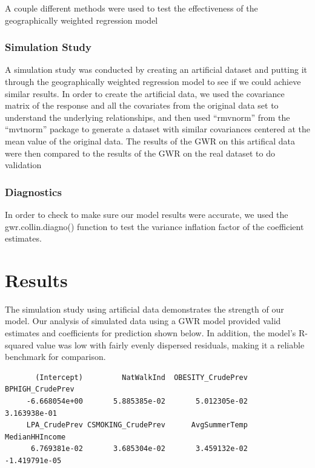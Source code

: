 \documentclass[
]{article}
\begin{document}
A couple different methods were used to test the effectiveness of the
geographically weighted regression model

\subsubsection{Simulation Study}\label{simulation-study}

A simulation study was conducted by creating an artificial dataset and
putting it through the geographically weighted regression model to see
if we could achieve similar results. In order to create the artificial
data, we used the covariance matrix of the response and all the
covariates from the original data set to understand the underlying
relationships, and then used ``rmvnorm'' from the ``mvtnorm'' package to
generate a dataset with similar covariances centered at the mean value
of the original data. The results of the GWR on this artifical data were
then compared to the results of the GWR on the real dataset to do
validation

\subsubsection{Diagnostics}\label{diagnostics}

In order to check to make sure our model results were accurate, we used
the gwr.collin.diagno() function to test the variance inflation factor
of the coefficient estimates.

\section{Results}\label{results}

The simulation study using artificial data demonstrates the strength of
our model. Our analysis of simulated data using a GWR model provided
valid estimates and coefficients for prediction shown below. In
addition, the model's R-squared value was low with fairly evenly
dispersed residuals, making it a reliable benchmark for comparison.

\begin{verbatim}
       (Intercept)         NatWalkInd  OBESITY_CrudePrev   BPHIGH_CrudePrev 
     -6.668054e+00       5.885385e-02       5.012305e-02       3.163938e-01 
     LPA_CrudePrev CSMOKING_CrudePrev      AvgSummerTemp     MedianHHIncome 
      6.769381e-02       3.685304e-02       3.459132e-02      -1.419791e-05 
\end{verbatim}
\end{document}
